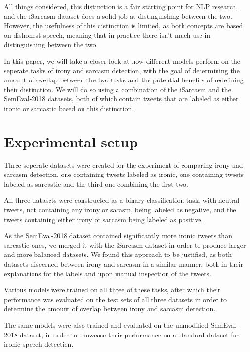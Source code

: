 \documentclass[10pt, a4paper]{article}
\begin{document}
All things considered, this distinction is a fair starting point for NLP research, and the iSarcasm \citep{iSarcasm} dataset
does a solid job at distinguishing between the two. However, the usefulness of this distinction is limited, as both concepts
are based on dishonest speech, meaning that in practice there isn't much use in distinguishing between the two.

In this paper, we will take a closer look at how different models perform on the seperate tasks of irony and sarcasm detection,
with the goal of determining the amount of overlap between the two tasks and the potential benefits of redefining their distinction.
We will do so using a combination of the iSarcasm \citep{iSarcasm} and the SemEval-2018 \citep{semeval-2018} 
datasets, both of which contain tweets that are labeled as either ironic or sarcastic based on this distinction.

\section{Experimental setup}

Three seperate datasets were created for the experiment of comparing irony and sarcasm detection, one containing tweets labeled
as ironic, one containing tweets labeled as sarcastic and the third one combining the first two.

All three datasets were constructed as a binary classification task, with neutral tweets, not containing any irony or sarasm,
being labeled as negative, and the tweets containing either irony or sarcasm being labeled as positive.

As the SemEval-2018 dataset contained significantly more
ironic tweets than sarcastic ones, we merged it with the iSarcasm dataset in order to produce larger and more balanced datasets.
We found this approach to be justified, as both datasets discerned between irony and sarcasm in a similar manner, both in
their explanations for the labels and upon manual inspection of the tweets. 

Various models were trained on all three of these tasks, after which their performance was evaluated on the test sets of all
three datasets in order to determine the amount of overlap between irony and sarcasm detection.

The same models were also trained and evaluated on the unmodified SemEval-2018 dataset, in order to showcase their performance
on a standard dataset for ironic speech detection.
\end{document}

